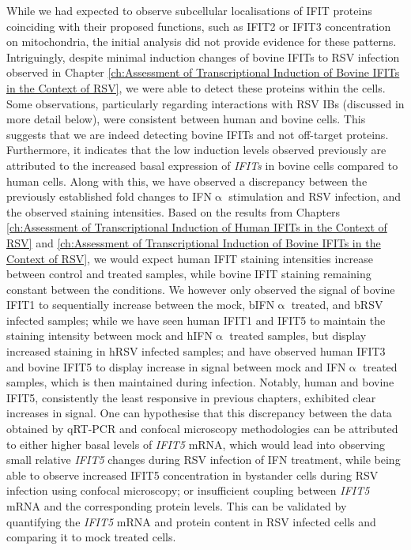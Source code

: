 While we had expected to observe subcellular localisations of IFIT proteins coinciding with their proposed functions, such as IFIT2 or IFIT3 concentration on mitochondria, the initial analysis did not provide evidence for these patterns. Intriguingly, despite minimal induction changes of bovine IFITs to RSV infection observed in Chapter \ref{ch:Assessment of Transcriptional Induction of Bovine IFITs in the Context of RSV}, we were able to detect these proteins within the cells. Some observations, particularly regarding interactions with RSV IBs (discussed in more detail below), were consistent between human and bovine cells. This suggests that we are indeed detecting bovine IFITs and not off-target proteins. Furthermore, it indicates that the low induction levels observed previously are attributed to the increased basal expression of \textit{IFITs} in bovine cells compared to human cells. Along with this, we have observed a discrepancy between the previously established fold changes to IFN$\upalpha$ stimulation and RSV infection, and the observed staining intensities. Based on the results from Chapters \ref{ch:Assessment of Transcriptional Induction of Human IFITs in the Context of RSV} and \ref{ch:Assessment of Transcriptional Induction of Bovine IFITs in the Context of RSV}, we would expect human IFIT staining intensities increase between control and treated samples, while bovine IFIT staining remaining constant between the conditions. We however only observed the signal of bovine IFIT1 to sequentially increase between the mock, bIFN$\upalpha$ treated, and bRSV infected samples; while we have seen human IFIT1 and IFIT5 to maintain the staining intensity between mock and hIFN$\upalpha$ treated samples, but display increased staining in hRSV infected samples; and have observed human IFIT3 and bovine IFIT5 to display increase in signal between mock and IFN$\upalpha$ treated samples, which is then maintained during infection. Notably, human and bovine IFIT5, consistently the least responsive in previous chapters, exhibited clear increases in signal. One can hypothesise that this discrepancy between the data obtained by qRT-PCR and confocal microscopy methodologies can be attributed to either higher basal levels of \textit{IFIT5} mRNA, which would lead into observing small relative \textit{IFIT5} changes during RSV infection of IFN treatment, while being able to observe increased IFIT5 concentration in bystander cells during RSV infection using confocal microscopy; or insufficient coupling between \textit{IFIT5} mRNA and the corresponding protein levels. This can be validated by quantifying the \textit{IFIT5} mRNA and protein content in RSV infected cells and comparing it to mock treated cells.

